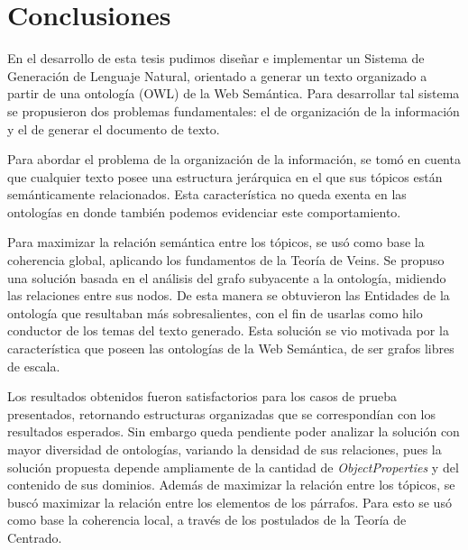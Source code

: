 \chapter{Conclusiones}
En el desarrollo de esta tesis pudimos diseñar e implementar un Sistema de Generación de Lenguaje Natural, orientado a generar un texto organizado a partir de una ontología (OWL) de la Web Semántica. Para desarrollar tal sistema se propusieron dos problemas fundamentales: el de organización de la información y el de generar el documento de texto. 

Para abordar el problema de la organización de la información, se tomó en cuenta que cualquier texto  posee una estructura jerárquica en el que sus tópicos  están semánticamente relacionados. Esta característica no queda exenta en las ontologías en donde también podemos evidenciar este comportamiento. 

Para maximizar la relación semántica entre los tópicos, se usó como base la coherencia global, aplicando los fundamentos de la Teoría de Veins. Se propuso una solución basada en el análisis del grafo subyacente a la ontología, midiendo las relaciones entre sus nodos. De esta manera se obtuvieron las Entidades de la ontología que resultaban más sobresalientes, con el fin de usarlas como hilo conductor de los temas del texto generado.
Esta solución se vio motivada por la característica que poseen las ontologías de la Web Semántica, de ser grafos libres de escala. 

Los resultados obtenidos fueron satisfactorios para los casos de prueba presentados, retornando estructuras organizadas que se correspondían con los resultados esperados. Sin embargo queda pendiente poder analizar la solución con mayor diversidad de ontologías, variando la densidad de sus relaciones, pues la solución propuesta depende ampliamente de la cantidad de \emph{ObjectProperties} y del contenido de sus dominios.
Además de maximizar la relación entre los tópicos, se buscó maximizar la relación entre los elementos de los párrafos. Para esto se usó como base la coherencia local, a través de los postulados de la Teoría de Centrado.

